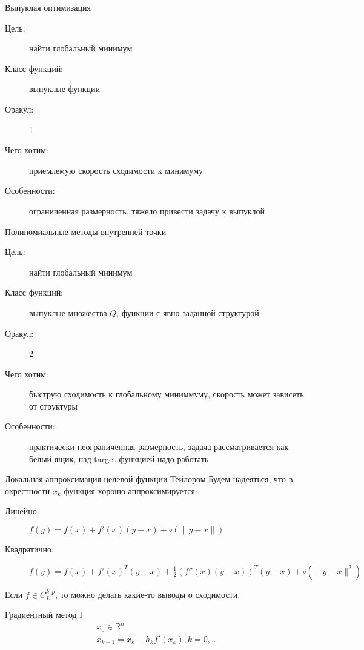 \documentclass[14pt, fleqn, xcolor={dvipsnames, table}]{beamer}
\begin{document}
\begin{frame}{Выпуклая оптимизация}
\begin{description}
  \item [\color{blue}Цель:] найти глобальный минимум
  \item [\color{blue}Класс функций:] выпуклые функции
  \item [\color{blue}Оракул:] 1
  \item [\color{blue}Чего хотим:] приемлемую скорость сходимости к минимуму
  \item [\color{blue}Особенности:] ограниченная размерность, тяжело привести задачу к выпуклой
\end{description}
\end{frame}

\begin{frame}{Полиномиальные методы внутренней точки}
\begin{description}
  \item [\color{blue}Цель:] найти глобальный минимум
  \item [\color{blue}Класс функций:] выпуклые множества $Q$, функции с явно заданной структурой
  \item [\color{blue}Оракул:] 2
  \item [\color{blue}Чего хотим:] быструю сходимость к глобальному миниммуму, скорость может зависеть от структуры
  \item [\color{blue}Особенности:] практически неограниченная размерность, задача рассматривается как белый ящик, над target функцией надо работать
\end{description}
\end{frame}


\begin{frame}{Локальная аппроксимация целевой функции Тейлором}
Будем надеяться, что в окрестности $x_k$ функция хорошо аппроксимируется:
\begin{description}
  \item [\color{blue}Линейно:] $f(y) = f(x) + f'(x)(y - x) + \circ(\|y - x\|)$
  \item [\color{blue}Квадратично:] $f(y) = f(x) + f'(x)^T(y - x) + \frac{1}{2}(f''(x)(y - x ))^T(y - x) + \circ(\|y - x\|^2)$
\end{description}
Если $f \in C_{L}^{k,p}$, то можно делать какие-то выводы о сходимости.
\end{frame}


\begin{frame}{Градиентный метод I}
$$\begin{array}{l}
x_0 \in \mathbb{R}^n \\
x_{k+1} = x_k - h_k f'(x_k), k= 0,... \\
\end{array}$$
\end{frame}
\end{document}

